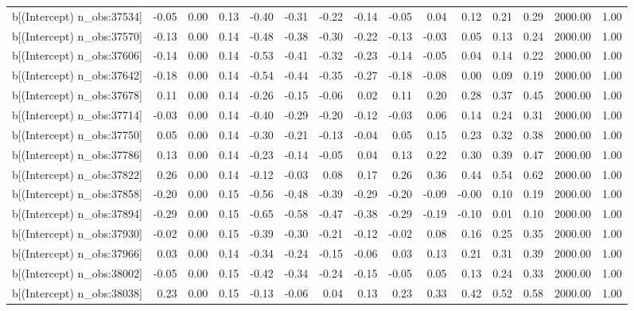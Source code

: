 \begin{table}[ht]
\begin{tabular}{rrrrrrrrrrrrrrr}
  b[(Intercept) n\_obs:37534] & -0.05 & 0.00 & 0.13 & -0.40 & -0.31 & -0.22 & -0.14 & -0.05 & 0.04 & 0.12 & 0.21 & 0.29 & 2000.00 & 1.00 \\ 
  b[(Intercept) n\_obs:37570] & -0.13 & 0.00 & 0.14 & -0.48 & -0.38 & -0.30 & -0.22 & -0.13 & -0.03 & 0.05 & 0.13 & 0.24 & 2000.00 & 1.00 \\ 
  b[(Intercept) n\_obs:37606] & -0.14 & 0.00 & 0.14 & -0.53 & -0.41 & -0.32 & -0.23 & -0.14 & -0.05 & 0.04 & 0.14 & 0.22 & 2000.00 & 1.00 \\ 
  b[(Intercept) n\_obs:37642] & -0.18 & 0.00 & 0.14 & -0.54 & -0.44 & -0.35 & -0.27 & -0.18 & -0.08 & 0.00 & 0.09 & 0.19 & 2000.00 & 1.00 \\ 
  b[(Intercept) n\_obs:37678] & 0.11 & 0.00 & 0.14 & -0.26 & -0.15 & -0.06 & 0.02 & 0.11 & 0.20 & 0.28 & 0.37 & 0.45 & 2000.00 & 1.00 \\ 
  b[(Intercept) n\_obs:37714] & -0.03 & 0.00 & 0.14 & -0.40 & -0.29 & -0.20 & -0.12 & -0.03 & 0.06 & 0.14 & 0.24 & 0.31 & 2000.00 & 1.00 \\ 
  b[(Intercept) n\_obs:37750] & 0.05 & 0.00 & 0.14 & -0.30 & -0.21 & -0.13 & -0.04 & 0.05 & 0.15 & 0.23 & 0.32 & 0.38 & 2000.00 & 1.00 \\ 
  b[(Intercept) n\_obs:37786] & 0.13 & 0.00 & 0.14 & -0.23 & -0.14 & -0.05 & 0.04 & 0.13 & 0.22 & 0.30 & 0.39 & 0.47 & 2000.00 & 1.00 \\ 
  b[(Intercept) n\_obs:37822] & 0.26 & 0.00 & 0.14 & -0.12 & -0.03 & 0.08 & 0.17 & 0.26 & 0.36 & 0.44 & 0.54 & 0.62 & 2000.00 & 1.00 \\ 
  b[(Intercept) n\_obs:37858] & -0.20 & 0.00 & 0.15 & -0.56 & -0.48 & -0.39 & -0.29 & -0.20 & -0.09 & -0.00 & 0.10 & 0.19 & 2000.00 & 1.00 \\ 
  b[(Intercept) n\_obs:37894] & -0.29 & 0.00 & 0.15 & -0.65 & -0.58 & -0.47 & -0.38 & -0.29 & -0.19 & -0.10 & 0.01 & 0.10 & 2000.00 & 1.00 \\ 
  b[(Intercept) n\_obs:37930] & -0.02 & 0.00 & 0.15 & -0.39 & -0.30 & -0.21 & -0.12 & -0.02 & 0.08 & 0.16 & 0.25 & 0.35 & 2000.00 & 1.00 \\ 
  b[(Intercept) n\_obs:37966] & 0.03 & 0.00 & 0.14 & -0.34 & -0.24 & -0.15 & -0.06 & 0.03 & 0.13 & 0.21 & 0.31 & 0.39 & 2000.00 & 1.00 \\ 
  b[(Intercept) n\_obs:38002] & -0.05 & 0.00 & 0.15 & -0.42 & -0.34 & -0.24 & -0.15 & -0.05 & 0.05 & 0.13 & 0.24 & 0.33 & 2000.00 & 1.00 \\ 
  b[(Intercept) n\_obs:38038] & 0.23 & 0.00 & 0.15 & -0.13 & -0.06 & 0.04 & 0.13 & 0.23 & 0.33 & 0.42 & 0.52 & 0.58 & 2000.00 & 1.00 \\ 

\end{tabular}
\end{table}
